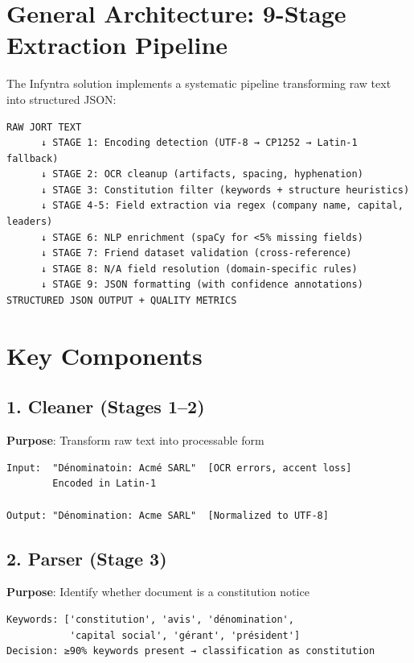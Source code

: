 \documentclass[12pt,a4paper]{report}
\begin{document}
\section{General Architecture: 9-Stage Extraction Pipeline}

The Infyntra solution implements a systematic pipeline transforming raw text into structured JSON:

\begin{verbatim}
RAW JORT TEXT
      ↓ STAGE 1: Encoding detection (UTF-8 → CP1252 → Latin-1 fallback)
      ↓ STAGE 2: OCR cleanup (artifacts, spacing, hyphenation)
      ↓ STAGE 3: Constitution filter (keywords + structure heuristics)
      ↓ STAGE 4-5: Field extraction via regex (company name, capital, leaders)
      ↓ STAGE 6: NLP enrichment (spaCy for <5% missing fields)
      ↓ STAGE 7: Friend dataset validation (cross-reference)
      ↓ STAGE 8: N/A field resolution (domain-specific rules)
      ↓ STAGE 9: JSON formatting (with confidence annotations)
STRUCTURED JSON OUTPUT + QUALITY METRICS
\end{verbatim}

\section{Key Components}

\subsection{1. Cleaner (Stages 1--2)}

\textbf{Purpose}: Transform raw text into processable form

\begin{verbatim}
Input:  "Dénominatoin: Acmé SARL"  [OCR errors, accent loss]
        Encoded in Latin-1
        
Output: "Dénomination: Acme SARL"  [Normalized to UTF-8]
\end{verbatim}

\subsection{2. Parser (Stage 3)}

\textbf{Purpose}: Identify whether document is a constitution notice

\begin{verbatim}
Keywords: ['constitution', 'avis', 'dénomination', 
           'capital social', 'gérant', 'président']
Decision: ≥90% keywords present → classification as constitution
\end{verbatim}
\end{document}
